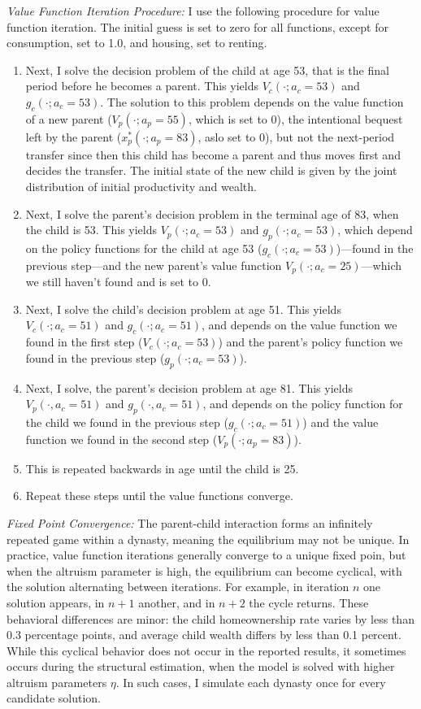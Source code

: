 \documentclass[12pt]{article}
\begin{document}
\textit{Value Function Iteration Procedure:}
I use the following procedure for value function iteration. The initial guess is set to zero for all functions, except for consumption, set to 1.0, and housing, set to renting.
\begin{enumerate}
    \item Next, I solve the decision problem of the child at age 53, that is the final period before he becomes a parent. This yields $V_c(\cdot;a_c=53)$ and $g_c(\cdot;a_c=53)$. The solution to this problem depends on the value function of a new parent ($V_p(\cdot;a_p=55)$, which is set to 0), the intentional bequest left by the parent ($x_p^*(\cdot;a_p=83)$, aslo set to 0), but not the next-period transfer since then this child has become a parent and thus moves first and decides the transfer. The initial state of the new child is given by the joint distribution of initial productivity and wealth.
    \item Next, I solve the parent's decision problem in the terminal age of 83, when the child is 53. This yields $V_p(\cdot;a_c=53)$ and $g_p(\cdot;a_c=53)$, which depend on the policy functions for the child at age 53 ($g_c(\cdot;a_c=53)$)---found in the previous step---and the new parent's value function $V_p(\cdot;a_c=25)$---which we still haven't found and is set to 0.
    \item Next, I solve the child's decision problem at age 51. This yields $V_c(\cdot;a_c=51)$ and $g_c(\cdot;a_c=51)$, and depends on the value function we found in the first step ($V_c(\cdot;a_c=53)$) and the parent's policy function we found in the previous step ($g_p(\cdot;a_c=53)$).
    \item Next, I solve, the parent's decision problem at age 81. This yields $V_p(\cdot,a_c=51)$ and $g_p(\cdot,a_c=51)$, and depends on the policy function for the child we found in the previous step ($g_c(\cdot;a_c=51)$) and the value function we found in the second step ($V_p(\cdot;a_p=83)$).
    \item This is repeated backwards in age until the child is 25.
    \item Repeat these steps until the value functions converge.
\end{enumerate}

\textit{Fixed Point Convergence:} 
The parent-child interaction forms an infinitely repeated game within a dynasty, meaning the equilibrium may not be unique. In practice, value function iterations generally converge to a unique fixed poin, but when the altruism parameter is high, the equilibrium can become cyclical, with the solution alternating between iterations. For example, in iteration $n$ one solution appears, in $n+1$ another, and in $n+2$ the cycle returns. These behavioral differences are minor: the child homeownership rate varies by less than 0.3 percentage points, and average child wealth differs by less than 0.1 percent. While this cyclical behavior does not occur in the reported results, it sometimes occurs during the structural estimation, when the model is solved with higher altruism parameters $\eta$. In such cases, I simulate each dynasty once for every candidate solution.
\end{document}
